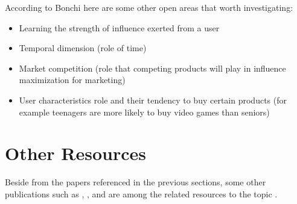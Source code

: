 \documentclass[english]{tktltiki}
\begin{document}
According to Bonchi \cite{Bon11} here are some other open areas that worth investigating:
\begin{itemize}
\item Learning the strength of influence exerted from a user
\item Temporal dimension (role of time)
\item Market competition (role that competing products will play in influence maximization for marketing)
\item User characteristics role and their tendency to buy certain products (for example teenagers are more likely to buy video games than seniors)
\end{itemize}

\section{Other Resources}
Beside from the papers referenced in the previous sections, some other publications such as \cite{domingo02}, \cite{goyal10}, and \cite{cheng13} are among the related resources to the topic .\\
\pagebreak



\lastpage

\pagestyle{empty}
\end{document}
